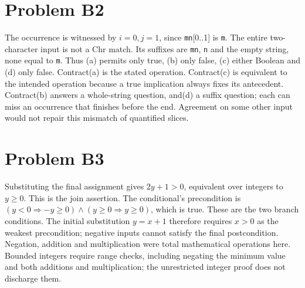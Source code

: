 \documentclass[11pt]{article}
\begin{document}
\section*{Problem B2}\label{ans:B2}
\begin{answer}
The occurrence is witnessed by $i=0,j=1$, since \texttt{mn}[0..1] is
\texttt{m}. The entire two-character input is not a Chr match. Its suffixes
are \texttt{mn}, \texttt{n} and the empty string, none equal to \texttt{m}.
Thus (a) permits only true, (b) only false, (c) either Boolean and (d) only
false. Contract(a) is the stated operation. Contract(c) is equivalent to the intended operation because a true implication always fixes its antecedent.
Contract(b) answers a whole-string question, and(d) a suffix question; each
can miss an occurrence that finishes before the end. Agreement on some other
input would not repair this mismatch of quantified slices.
\end{answer}
\section*{Problem B3}\label{ans:B3}
\begin{answer}
Substituting the final assignment gives $2y+1>0$, equivalent over integers
to $y\geq0$. This is the join assertion. The conditional's precondition is
$(y<0\Rightarrow -y\geq0)\land(y\geq0\Rightarrow y\geq0)$, which is true.
These are the two branch conditions. The initial substitution $y=x+1$
therefore requires $x>0$ as the weakest precondition; negative inputs cannot satisfy the final postcondition. Negation, addition and
multiplication were total mathematical operations here. Bounded integers
require range checks, including negating the minimum value and both additions
and multiplication; the unrestricted integer proof does not discharge them.
\end{answer}
\end{document}
